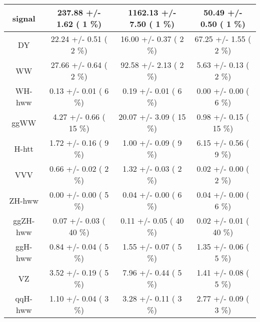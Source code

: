 \begin{table}[h!]\begin{center}

\footnotesize{\begin{tabular}{
c| c | c | c | } \hline
\hline
        signal   &     237.88 +/-       1.62 (         1 \%)   &    1162.13 +/-       7.50 (         1 \%)   &      50.49 +/-       0.50 (         1 \%)  \\
\hline
            DY   &      22.24 +/-       0.51 (         2 \%)   &      16.00 +/-       0.37 (         2 \%)   &      67.25 +/-       1.55 (         2 \%)  \\
            WW   &      27.66 +/-       0.64 (         2 \%)   &      92.58 +/-       2.13 (         2 \%)   &       5.63 +/-       0.13 (         2 \%)  \\
        WH-hww   &       0.13 +/-       0.01 (         6 \%)   &       0.19 +/-       0.01 (         6 \%)   &       0.00 +/-       0.00 (         6 \%)  \\
          ggWW   &       4.27 +/-       0.66 (        15 \%)   &      20.07 +/-       3.09 (        15 \%)   &       0.98 +/-       0.15 (        15 \%)  \\
         H-htt   &       1.72 +/-       0.16 (         9 \%)   &       1.00 +/-       0.09 (         9 \%)   &       6.15 +/-       0.56 (         9 \%)  \\
           VVV   &       0.66 +/-       0.02 (         2 \%)   &       1.32 +/-       0.03 (         2 \%)   &       0.02 +/-       0.00 (         2 \%)  \\
        ZH-hww   &       0.00 +/-       0.00 (         5 \%)   &       0.04 +/-       0.00 (         6 \%)   &       0.04 +/-       0.00 (         6 \%)  \\
      ggZH-hww   &       0.07 +/-       0.03 (        40 \%)   &       0.11 +/-       0.05 (        40 \%)   &       0.02 +/-       0.01 (        40 \%)  \\
       ggH-hww   &       0.84 +/-       0.04 (         5 \%)   &       1.55 +/-       0.07 (         5 \%)   &       1.35 +/-       0.06 (         5 \%)  \\
            VZ   &       3.52 +/-       0.19 (         5 \%)   &       7.96 +/-       0.44 (         5 \%)   &       1.41 +/-       0.08 (         5 \%)  \\
       qqH-hww   &       1.10 +/-       0.04 (         3 \%)   &       3.28 +/-       0.11 (         3 \%)   &       2.77 +/-       0.09 (         3 \%)  \\

\end{tabular}}
\end{center}
\end{table}
